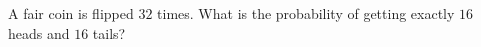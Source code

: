 A fair coin is flipped $32$ times. What is the probability of getting exactly $16$ heads and $16$ tails?
